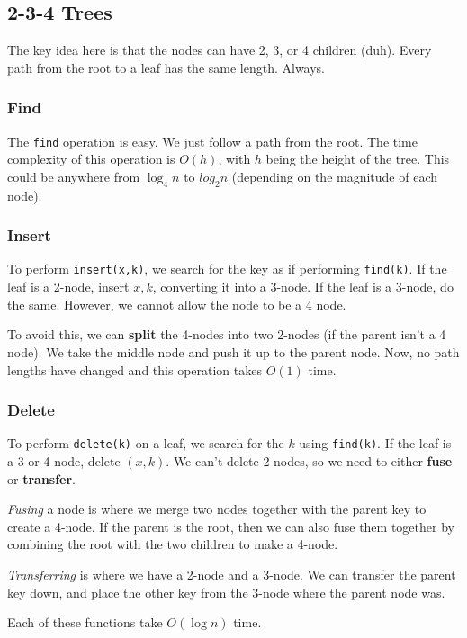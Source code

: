 \documentclass[11pt,fleqn,a4paper,titlepage,dvipsnames,cmyk]{scrartcl}
\begin{document}
\subsection{2-3-4 Trees}%
\label{sub:2-3-4}
The key idea here is that the nodes can have 2, 3, or 4 children (duh).
Every path from the root to a leaf has the same length. Always. 

\subsubsection{Find}%
\label{ssub:Find}
The \texttt{find} operation is easy. We just follow a path from the root.
The time complexity of this operation is $O(h)$, with $h$ being the height
of the tree. This could be anywhere from $\log_4n$ to $log_2n$ (depending
on the magnitude of each node).

\subsubsection{Insert}%
\label{ssub:Insert}
To perform \texttt{insert(x,k)}, we search for the key as if performing
\texttt{find(k)}. If the leaf is a 2-node, insert $x,k$, converting it
into a 3-node. If the leaf is a 3-node, do the same. However, we cannot
allow the node to be a 4 node.

To avoid this, we can \textbf{split} the 4-nodes into two 2-nodes (if the
parent isn't a 4 node). We take the middle node and push it up to the
parent node. Now, no path lengths have changed and this operation takes
$O(1)$ time.

\subsubsection{Delete}%
\label{ssub:Delete}
To perform \texttt{delete(k)} on a leaf, we search for the $k$ using
\texttt{find(k)}. If the leaf is a 3 or 4-node, delete $(x,k)$. We can't
delete 2 nodes, so we need to either \textbf{fuse} or \textbf{transfer}.

\textit{Fusing} a node is where we merge two nodes together with the
parent key to create a 4-node. If the parent is the root, then we can also
fuse them together by combining the root with the two children to make a
4-node.

\textit{Transferring} is where we have a 2-node and a 3-node. We can
transfer the parent key down, and place the other key from the 3-node
where the parent node was.

Each of these functions take $O(\log n)$ time.
\end{document}

